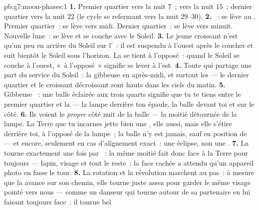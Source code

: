 \begin{solution}{pb:g7:moon-phases:1}
\textbf{1.} Premier quartier vers la nuit $7$~;  vers la
nuit $15$~; dernier quartier vers la nuit $22$ (le cycle se refermant
vers la nuit $29$--$30$).
\textbf{2.} ~: se lève au . Premier
quartier~: se lève vers midi. Dernier quartier~: se lève vers minuit.
Nouvelle lune~: se lève et se couche avec le Soleil.
\textbf{3.} Le jeune croissant n'est qu'un peu en arrière du Soleil
sur l'~: il est suspendu à l'ouest après le coucher et suit
bientôt le Soleil sous l'horizon. La  se tient à
l'opposé~: quand le Soleil se couche à l'ouest, «~à l'opposé~»
signifie se lever à l'est.
\textbf{4.} Toute  qui partage une part du service du Soleil~:
la gibbeuse  en après-midi, et surtout les 
 --- le dernier quartier et le croissant décroissant
sont hauts dans les ciels du matin.
\textbf{5.} Gibbeuse ~: une balle éclairée aux trois quarts
signifie que tu te tiens entre le premier quartier et la  --- la lampe derrière ton épaule, la balle devant toi et sur le
côté.
\textbf{6.} Ils voient le \emph{propre} côté nuit de la balle --- la
moitié détournée de la lampe. La Terre que tu incarnes jette bien une
, elle aussi, mais elle s'étire derrière toi, à l'opposé de la
lampe~; la balle n'y est jamais, sauf en position de  ---
et encore, seulement en cas d'alignement exact~: une éclipse, non une
.
\textbf{7.} La  tourne exactement une fois par ~: la même
moitié fait donc face à la Terre pour toujours --- lapin, visage et
tout le reste~; la face cachée a attendu qu'un appareil photo en
fasse le tour.
\textbf{8.} La rotation et la révolution marchent au pas~: à mesure
que la  avance sur son chemin, elle tourne juste assez pour
garder le même visage pointé vers nous --- comme un danseur qui tourne
autour de sa partenaire en lui faisant toujours face~: il tourne bel

\end{solution}
